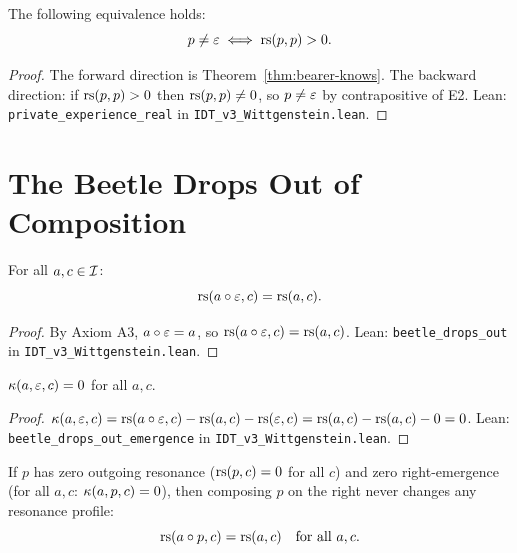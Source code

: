 \begin{theorem}
\label{thm:private-real}
The following equivalence holds:
\[
p \neq \varepsilon \iff \mathrm{rs}(p, p) > 0.
\]
\end{theorem}

\begin{proof}
The forward direction is Theorem~\ref{thm:bearer-knows}. The backward direction:
if $\mathrm{rs}(p,p) > 0$ then $\mathrm{rs}(p,p) \neq 0$, so $p \neq \varepsilon$ by contrapositive
of E2. Lean: \texttt{private\_experience\_real} in \texttt{IDT\_v3\_Wittgenstein.lean}.
\end{proof}

\section{The Beetle Drops Out of Composition}

\begin{theorem}
\label{thm:beetle-compose}
For all $a, c \in \mathcal{I}$:
\[
\mathrm{rs}(a \circ \varepsilon, c) = \mathrm{rs}(a, c).
\]
\end{theorem}

\begin{proof}
By Axiom A3, $a \circ \varepsilon = a$, so $\mathrm{rs}(a \circ \varepsilon, c) = \mathrm{rs}(a, c)$.
Lean: \texttt{beetle\_drops\_out} in \texttt{IDT\_v3\_Wittgenstein.lean}.
\end{proof}

\begin{theorem}
\label{thm:beetle-emergence}
$\kappa(a, \varepsilon, c) = 0$ for all $a, c$.
\end{theorem}

\begin{proof}
$\kappa(a, \varepsilon, c) = \mathrm{rs}(a \circ \varepsilon, c) - \mathrm{rs}(a,c) - \mathrm{rs}(\varepsilon, c) = \mathrm{rs}(a,c) - \mathrm{rs}(a,c) - 0 = 0$.
Lean: \texttt{beetle\_drops\_out\_emergence} in \texttt{IDT\_v3\_Wittgenstein.lean}.
\end{proof}

\begin{theorem}
\label{thm:private-drops-out}
If $p$ has zero outgoing resonance ($\mathrm{rs}(p,c) = 0$ for all $c$) and zero
right-emergence (for all $a, c$: $\kappa(a,p,c) = 0$), then composing $p$
on the right never changes any resonance profile:
\[
\mathrm{rs}(a \circ p, c) = \mathrm{rs}(a, c) \quad \text{for all } a, c.
\]
\end{theorem}

